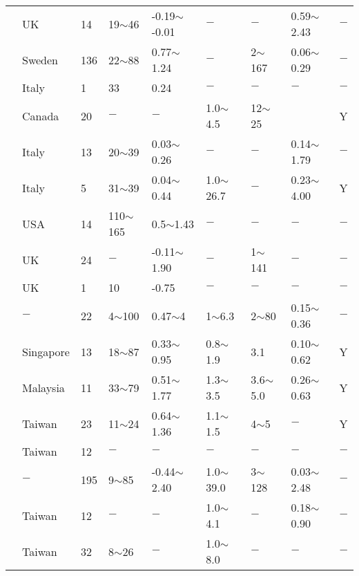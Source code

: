 {\begin{longtable}{lllllllll}
    \citet{Burland1977557} & UK    & 14    & 19$\sim$46 & -0.19$\sim$-0.01 & $-$     & $-$     & 0.59$\sim$2.43 & $-$ \\
    \citet{Cadling19501} & Sweden & 136   & 22$\sim$88 & 0.77$\sim$1.24 & $-$     & 2$\sim$167 & 0.06$\sim$0.29 & $-$ \\
    \citet{Calabresi1973233} & Italy & 1     & 33    & 0.24  & $-$     & $-$     & $-$     & $-$ \\
    \citet{Campanella1988203} & Canada & 20    & $-$     & $-$     & 1.0$\sim$4.5 & 12$\sim$25 &       & Y \\
    \citet{Cancelli1981377} & Italy & 13    & 20$\sim$39 & 0.03$\sim$0.26 & $-$     & $-$     & 0.14$\sim$1.79 & $-$ \\
    \citet{Cancelli1984637} & Italy & 5     & 31$\sim$39 & 0.04$\sim$0.44 & 1.0$\sim$26.7 & $-$     & 0.23$\sim$4.00 & Y \\
    \citet{Carrier1984211} & USA   & 14    & 110$\sim$165 & 0.5$\sim$1.43 & $-$     & $-$     & $-$     & $-$ \\
    \citet{Carter1991} & UK    & 24    & $-$     & -0.11$\sim$1.90 & $-$     & 1$\sim$141 & $-$     & $-$ \\
    \citet{Chandler1969321} & UK    & 1     & 10    & -0.75 & $-$     & $-$     & $-$     & $-$ \\
    \citet{Chandler198813} & $-$     & 22    & 4$\sim$100 & 0.47$\sim$4 & 1$\sim$6.3 & 2$\sim$80  & 0.15$\sim$0.36 & $-$ \\
    \citet{Chang1991210} & Singapore & 13    & 18$\sim$87 & 0.33$\sim$0.95 & 0.8$\sim$1.9 & 3.1   & 0.10$\sim$0.62 & Y \\
                         & Malaysia & 11    & 33$\sim$79 & 0.51$\sim$1.77 & 1.3$\sim$3.5 & 3.6$\sim$5.0 & 0.26$\sim$0.63 & Y \\
    \citet{Chen199655} & Taiwan & 23    & 11$\sim$24 & 0.64$\sim$1.36 & 1.1$\sim$1.5 & 4$\sim$5   & $-$     & Y \\
    \citet{Chen200129} & Taiwan & 12    & $-$     & $-$     & $-$     & $-$     & $-$     & $-$ \\
    \citet{Chen19931732} & $-$     & 195   & 9$\sim$85  & -0.44$\sim$2.40 & 1.0$\sim$39.0 & 3$\sim$128 & 0.03$\sim$2.48 & $-$ \\
    \citet{Chin1997665} & Taiwan & 12    & $-$     & $-$     & 1.0$\sim$4.1 & $-$     & 0.18$\sim$0.90 & $-$ \\
    \citet{Chin1989245} & Taiwan & 32    & 8$\sim$26  & $-$     & 1.0$\sim$8.0 & $-$     & $-$     & $-$ \\

\end{longtable}}
